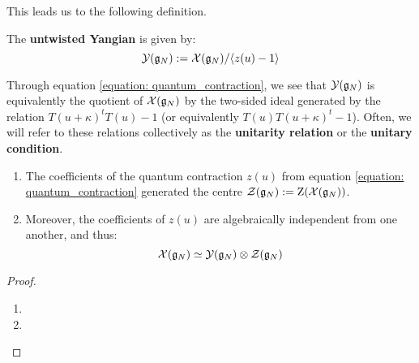         This leads us to the following definition.
        \begin{definition} \label{def: untwisted_yangians}
            The \textbf{untwisted Yangian} is given by:
                $$\mathcal{Y}(\mathfrak{g}_N) := \mathcal{X}(\mathfrak{g}_N)/\langle z(u) - 1\rangle$$
        \end{definition}
        \begin{remark}[Unitarity]
            Through equation \eqref{equation: quantum_contraction}, we see that $\mathcal{Y}(\mathfrak{g}_N)$ is equivalently the quotient of $\mathcal{X}(\mathfrak{g}_N)$ by the two-sided ideal generated by the relation $T(u + \kappa)^t T(u) - 1$ (or equivalently $T(u) T(u + \kappa)^t - 1$). Often, we will refer to these relations collectively as the \textbf{unitarity relation} or the \textbf{unitary condition}.
        \end{remark}
        \begin{lemma} \label{lemma: centres_of_extended_untwisted_yangians}
            \begin{enumerate}
                \item The coefficients of the quantum contraction $z(u)$ from equation \eqref{equation: quantum_contraction} generated the centre $\mathcal{Z}(\mathfrak{g}_N) := \mathrm{Z}( \mathcal{X}(\mathfrak{g}_N) )$.
                \item Moreover, the coefficients of $z(u)$ are algebraically independent from one another, and thus:
                    $$\calX(\g_N) \cong \calY(\g_N) \tensor \calZ(\g_N)$$
            \end{enumerate}
        \end{lemma}
            \begin{proof}
                \begin{enumerate}
                    \item 
                    \item 
                \end{enumerate}
            \end{proof}

